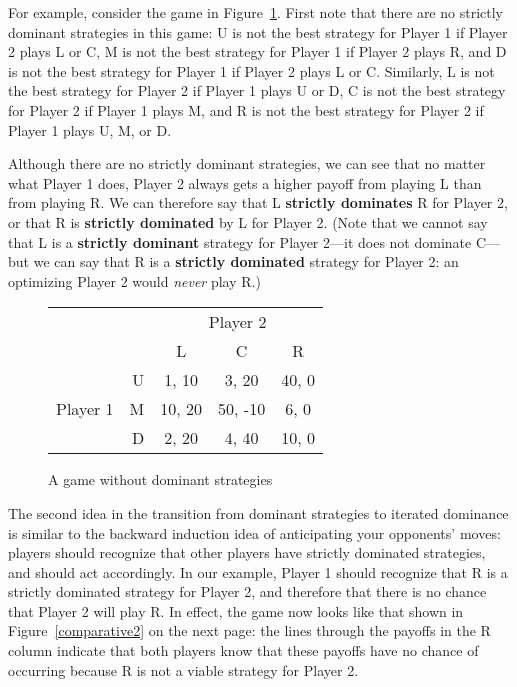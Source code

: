 For example, consider the game in Figure~\ref{comparative1}. First note that there are no strictly dominant strategies in this game: U is not the best strategy for Player 1 if Player 2 plays L or C, M is not the best strategy for Player 1 if Player 2 plays R, and D is not the best strategy for Player 1 if Player 2 plays L or C. Similarly, L is not the best strategy for Player 2 if Player 1 plays U or D, C is not the best strategy for Player 2 if Player 1 plays M, and R is not the best strategy for Player 2 if Player 1 plays U, M, or D.

Although there are no strictly dominant strategies, we can see that no matter what Player 1 does, Player 2 always gets a higher payoff from playing L than from playing R. We can therefore say that L \textbf{strictly dominates} R for Player 2, or that R is \textbf{strictly dominated} by L for Player 2. (Note that we cannot say that L is a \textbf{strictly dominant} strategy for Player 2---it does not dominate C---but we can say that R is a \textbf{strictly dominated} strategy for Player 2: an optimizing Player 2 would \emph{never} play R.)

\begin{figure}[b]
\begin{center}
\begin{tabular}{crccc}
& & \multicolumn{3}{c}{Player 2} \\ [.15cm]
& & L & C & R \\ \cline{3-5}
\multirow{3}{1.5cm}{Player 1}
& U & \multicolumn{1}{|c|}{1, 10} & \multicolumn{1}{c}{3, 20} & \multicolumn{1}{|c|}{40, 0} \\ \cline{3-5}
& M & \multicolumn{1}{|c|}{10, 20} & \multicolumn{1}{c}{50, -10} & \multicolumn{1}{|c|}{6, 0} \\ \cline{3-5}
& D & \multicolumn{1}{|c|}{2, 20} & \multicolumn{1}{c}{4, 40} & \multicolumn{1}{|c|}{10, 0} \\ \cline{3-5}
\end{tabular}
\end{center}
\caption{A game without dominant strategies}
\label{comparative1} %
\end{figure}


The second idea in the transition from dominant strategies to iterated dominance is similar to the backward induction idea of anticipating your opponents' moves: players should recognize that other players have strictly dominated strategies, and should act accordingly. In our example, Player 1 should recognize that R is a strictly dominated strategy for Player 2, and therefore that there is no chance that Player 2 will play R. In effect, the game now looks like that shown in Figure~\ref{comparative2} on the next page: the lines through the payoffs in the R column indicate that both players know that these payoffs have no chance of occurring because R is not a viable strategy for Player 2.

